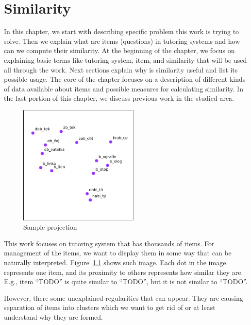 \documentclass[
  printed, %
  table,   %
  nolof,     %
  nolot,     %
  color,
  final,
  nocover
]{fithesis3}
\begin{document}

\chapter{Similarity}


In this chapter, we start with describing specific problem this work is trying to solve. Then we explain what are items (questions) in tutoring systems and how can we compute their similarity. At the beginning of the chapter, we focus on explaining basic terms like tutoring system, item, and similarity that will be used all through the work. Next sections explain why is similarity useful and list its possible usage. The core of the chapter focuses on a description of different kinds of data available about items and possible measures for calculating similarity. In the last portion of this chapter, we discuss previous work in the studied area.


\begin{figure}
    \includegraphics[width=6cm]{img/sample_projection_diagram}
  \caption{Sample projection}
  \label{fig:sample_projection}
\end{figure}

This work focuses on tutoring system \umimeCesky{} that has thousands of items. For management of the items, we want to display them in some way that can be naturally interpreted. Figure~\ref{fig:sample_projection} shows such image. Each dot in the image represents one item, and its proximity to others represents how similar they are. E.g., item ``TODO'' is quite similar to ``TODO'', but it is not similar to ``TODO''.

However, there some unexplained regularities that can appear. They are causing separation of items into clusters which we want to get rid of or at least understand why they are formed.
\end{document}
